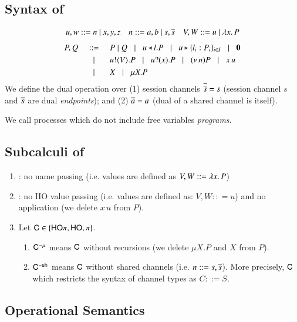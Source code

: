\subsection{Syntax of \HOp}
\label{subsec:syntax}
\[ 
\begin{array}{lll}
u,w  ::=  n \ | \ x,y,z
& n ::= a,b  \ | \ s, \overline{s} 
& V,W  ::=   u \ | \ \lambda x.\,P
\end{array}
\]
\[
\begin{array}{rclllll}
P,Q & ::= &  P\;|\; Q \;\;\;|\;\;\; 
 u \triangleleft l . P \;\;\;|\;\;\; u \triangleright \{l_i:P_i\}_{i \in I} \;\;\;|\;\;\; \mathbf{0} \\[1mm]
  & \;\;\;|\;\;\; & u ! \langle V \rangle .{P} \;\;\;|\;\;\; u ? (x) .{P} \;\;\;|\;\;\; (\nu\, n) P 
\;\;\;|\;\;\; x\, {u} 
\\[1mm]
      & \;\;\;|\;\;\; & X \;\;\;|\;\;\; \mu X. P
\end{array}
\]
We define the dual operation over (1) session channels $\overline{\overline{s}} = s$
(session channel $s$ and $\overline{s}$ are dual \emph{endpoints}); and 
(2) $\overline{a} = a$ (dual of a shared channel is itself).  

We call processes which do not include free variables {\em programs}.

\subsection{Subcalculi of \HOp}
\label{subsec:subcalculi}
\begin{enumerate}[$\bullet$]
\item \HO: no name passing (i.e. values are defined as $V,W :: = \lambda x.\,P$)
\item \sessp: no HO value passing (i.e. 
values are defined as:
$V,W :: = u$) and no application (we delete $x\, u$ from $P$). 
\item Let $\mathsf{C} \in \{\mathsf{HO}\pi, \mathsf{HO}, \pi\}$. 
\begin{enumerate}[-]
\item $\mathsf{C}^{-\mu}$ means 
$\mathsf{C}$ without recursions (we delete $\mu X.P$ and $X$ from $P$).   
\item 
$\mathsf{C}^{-\mathsf{sh}}$ means $\mathsf{C}$ without shared channels (i.e. 
$n ::= s, \overline{s}$). More precisely, $\mathsf{C}$ which restricts 
the syntax of channel types as $C::= S$.  
\end{enumerate}
\end{enumerate}

\subsection{Operational Semantics}
\label{subsec:semantics}


